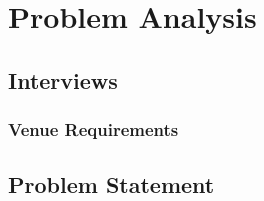 \chapter{Problem Analysis}
\label{cha:problem_analysis}
\section{Interviews}





\subsection{Venue Requirements}


\section{Problem Statement}
\label{ProblemStatement}


